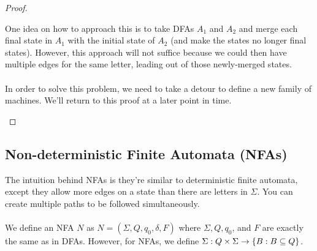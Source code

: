 \documentclass[]{article}
\DeclarePairedDelimiter{\set}{\lbrace}{\rbrace}
\theoremstyle{definition}
\begin{document}
\begin{proof}
\begin{enumerate}
            One idea on how to approach this is to take DFAs $A_1$ and $A_2$ and merge each final state in $A_1$ with the initial state of $A_2$ (and make the states no longer final states). However, this approach will not suffice because we could then have multiple edges for the same letter, leading out of those newly-merged states.
            \\ \\
            In order to solve this problem, we need to take a detour to define a new family of machines. We'll return to this proof at a later point in time. \qedhere
          \end{enumerate}
        \end{proof}

    \subsection{Non-deterministic Finite Automata (NFAs)}
      The intuition behind NFAs is they're similar to deterministic finite automata, except they allow more edges on a state than there are letters in $\Sigma$. You can create multiple paths to be followed simultaneously.
      \\ \\
      We define an NFA $N$ as $N = (\Sigma, Q, q_0, \delta, F)$ where $\Sigma, Q, q_0$, and $F$ are exactly the same as in DFAs. However, for NFAs, we define $\Sigma: Q \times \Sigma \to \set{ B : B \subseteq Q }$.
\end{document}
